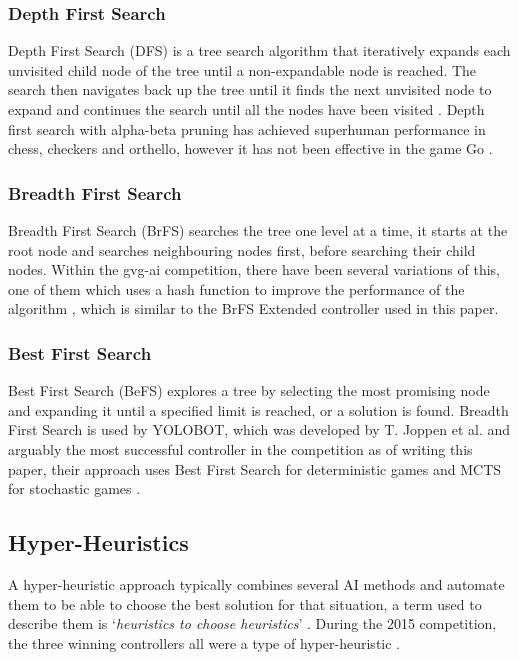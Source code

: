 \documentclass[journal]{IEEEtran}
\begin{document}
		\subsubsection{Depth First Search}
				Depth First Search (DFS) is a tree search algorithm that iteratively expands each unvisited child node of the tree until a non-expandable node is reached. The search then navigates back up the tree until it finds the next unvisited node to expand and continues the search until all the nodes have been visited \cite{perez2014solving}.
				Depth first search with alpha-beta pruning \cite{knuth1975analysis} has achieved superhuman performance in chess, checkers and orthello, however it has not been effective in the game Go \cite{silver2016mastering}.
			
		
		
		\subsubsection{Breadth First Search} \label{sssec:BrFS}
			Breadth First Search (BrFS) searches the tree one level at a time, it starts at the root node and searches neighbouring nodes first, before searching their child nodes. Within the gvg-ai competition, there have been several variations of this, one of them which uses a hash function to
improve the performance of the algorithm \cite{EfficientBFS}, which is similar to the BrFS Extended controller used in this paper.

	\subsubsection{Best First Search}\label{sssec:BeFS}
			Best First Search (BeFS) explores a tree by selecting the most promising node and expanding it until a specified limit is reached, or a solution is found.
			Breadth First Search is used by YOLOBOT, which was developed by T. Joppen et al. \cite{joppen2017informed} and arguably the most successful controller in the competition as of writing this paper, their approach uses Best First Search for deterministic games and MCTS for stochastic games \cite{perez2018general}.

	\subsection{Hyper-Heuristics}
		A hyper-heuristic approach typically combines several AI methods and automate them to be able to choose the best solution for that situation, a term used to describe them is `\textit{heuristics to choose heuristics}' \cite{burke2013hyper, burke2010classification}.
		During the 2015 competition, the three winning controllers all were a type of hyper-heuristic \cite{horn2016mcts}.
\end{document}
